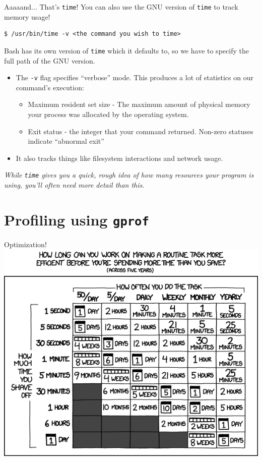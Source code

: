 \documentclass[11pt]{beamer}
\begin{document}
\begin{frame}[fragile=singleslide]{Aaaaand... That's \texttt{time}!}
You can also use the GNU version of \texttt{time} to track memory usage! 
\begin{lstlisting}[style=terminal]
$ /usr/bin/time -v <the command you wish to time>
\end{lstlisting}
Bash has its own version of \texttt{time} which it defaults to, so we have to specify the full path of the GNU version.  
\begin{itemize}
\item The \texttt{-v} flag specifies ``verbose'' mode. This produces a lot of statistics on our command's execution:
\begin{itemize}
\item Maximum resident set size - The maximum amount of physical memory your process was allocated by the operating system.  
\item Exit status - the integer that your command returned.  Non-zero statuses indicate ``abnormal exit''
\end{itemize}
\item It also tracks things like filesystem interactions and network usage.  
\end{itemize}

\center
\emph{While \texttt{time} gives you a quick, rough idea of how many resources your program is using, you'll often need more detail than this.}
\end{frame}

\section[gprof]{Profiling using \texttt{gprof}}
\begin{frame}{Optimization!}
\center
\includegraphics[scale=0.4]{optimizing.png}
\end{frame}
\end{document}
